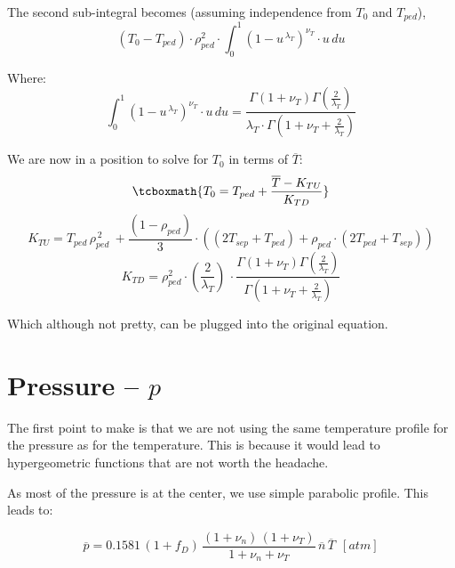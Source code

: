 The second sub-integral becomes (assuming independence from $T_0$ and $T_{ped}$),
\begin{equation}
	( T_{0} - T_{ped} ) \cdot \rho_{ped}^2 \cdot \int_0^{1} \left( 1 - u^{\,\lambda_T} \right)^{\nu_T}  \cdot u \, du
\end{equation}

Where:
\begin{equation}
	\int_0^{1} \left( 1 - u^{\,\lambda_T} \right)^{\nu_T}  \cdot u \, du =  \frac{ \Gamma \left( 1 + \nu_T  \right) \Gamma \left( \frac{2}{\lambda_T} \right) }{ \lambda_T \cdot \Gamma \left( 1 + \nu_T + \frac{2}{\lambda_T} \right) }
\end{equation}

We are now in a position to solve for $T_0$ in terms of $\overline{T}$:
\begin{equation}
	\tcboxmath{
	T_0 = T_{ped} + \frac{ \overline{T} - K_{TU} }{K_{TD}} }
\end{equation}
\begin{equation}
	K_{TU}  =  T_{ped} \, \rho_{ped}^{\,2}  \ +  \frac{ \left( 1 - \rho_{ped} \right ) }{3} \cdot \left( \left( 2 T_{sep} + T_{ped} \right) + \rho_{ped} \cdot \left( 2 T_{ped} + T_{sep}   \right)  \right) 
\end{equation}
\begin{equation}
	K_{TD} = \rho_{ped}^2 \cdot \left( \frac{ 2 }{ \lambda_T } \right) \, \cdot \frac{ \Gamma \left( 1 + \nu_T  \right) \Gamma \left( \frac{2}{\lambda_T} \right) }{ \Gamma \left( 1 + \nu_T + \frac{2}{\lambda_T} \right) }
\end{equation}

Which although not pretty, can be plugged into the original equation.

\section{Pressure -- $p$}

The first point to make is that we are not using the same temperature profile for the pressure as for the temperature. This is because it would lead to hypergeometric functions that are not worth the headache.

As most of the pressure is at the center, we use simple parabolic profile. This leads to:

\begin{equation}
	\overline{p} = 0.1581 \, ( 1 + f_D ) \, \frac{ (1 + \nu_n) \, (1 + \nu_T) }{1 + \nu_n + \nu_T } \, \overline{n} \, \overline{T} \ \ [atm]
\end{equation}

